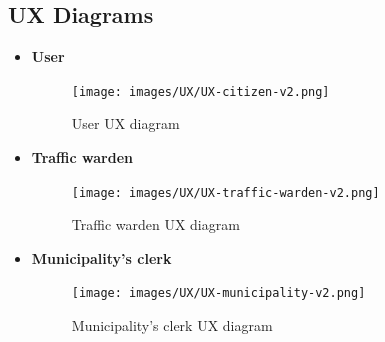 \documentclass{article}
\begin{document}
\clearpage
\subsection{UX Diagrams}
\begin{itemize} 
	\item \bf User
		\begin{figure}[!htb]
			\centering
			\texttt{[image: images/UX/UX-citizen-v2.png]}
			\caption{User UX diagram}
		\end{figure}

	\item \bf Traffic warden
		\begin{figure}[!htb]
			\centering
			\texttt{[image: images/UX/UX-traffic-warden-v2.png]}
			\caption{Traffic warden UX diagram}
		\end{figure}
\newpage
	\item \bf Municipality's clerk
		\begin{figure}[!htb]
			\centering
			\texttt{[image: images/UX/UX-municipality-v2.png]}
			\caption{Municipality's clerk UX diagram}
		\end{figure}
\end{itemize} 

\newpage
\end{document}
